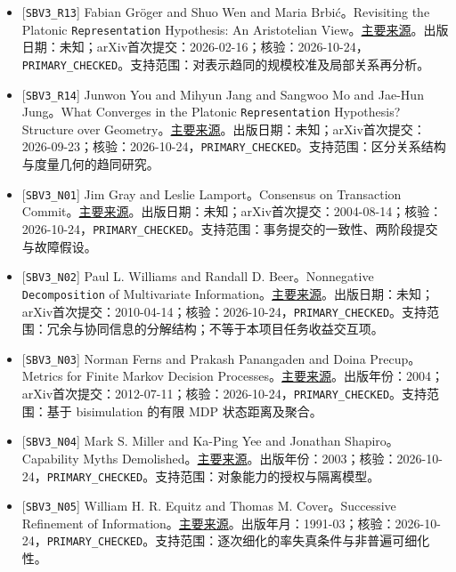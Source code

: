 \documentclass[
  10pt,
]{article}
\begin{document}
\begin{itemize}
\item
  {[}\nolinkurl{SBV3_R13}{]} Fabian Gröger and Shuo Wen and Maria
  Brbi{ć}。Revisiting the Platonic
  \nolinkurl{Representation} Hypothesis: An Aristotelian
  View。\href{https://arxiv.org/abs/2602.14486}{主要来源}。出版日期：未知；arXiv首次提交：2026-02-16；核验：2026-10-24，\nolinkurl{PRIMARY_CHECKED}。支持范围：对表示趋同的规模校准及局部关系再分析。
\item
  {[}\nolinkurl{SBV3_R14}{]} Junwon You and Mihyun Jang and Sangwoo Mo
  and Jae-Hun Jung。What Converges in the Platonic
  \nolinkurl{Representation} Hypothesis? Structure over
  Geometry。\href{https://arxiv.org/abs/2609.27252}{主要来源}。出版日期：未知；arXiv首次提交：2026-09-23；核验：2026-10-24，\nolinkurl{PRIMARY_CHECKED}。支持范围：区分关系结构与度量几何的趋同研究。
\item
  {[}\nolinkurl{SBV3_N01}{]} Jim Gray and Leslie Lamport。Consensus on
  Transaction
  Commit。\href{https://arxiv.org/abs/cs/0408036}{主要来源}。出版日期：未知；arXiv首次提交：2004-08-14；核验：2026-10-24，\nolinkurl{PRIMARY_CHECKED}。支持范围：事务提交的一致性、两阶段提交与故障假设。
\item
  {[}\nolinkurl{SBV3_N02}{]} Paul L. Williams and Randall D.
  Beer。Nonnegative \nolinkurl{Decomposition} of Multivariate
  Information。\href{https://arxiv.org/abs/1004.2515}{主要来源}。出版日期：未知；arXiv首次提交：2010-04-14；核验：2026-10-24，\nolinkurl{PRIMARY_CHECKED}。支持范围：冗余与协同信息的分解结构；不等于本项目任务收益交互项。
\item
  {[}\nolinkurl{SBV3_N03}{]} Norman Ferns and Prakash Panangaden and
  Doina Precup。Metrics for Finite Markov Decision
  Processes。\href{https://arxiv.org/abs/1207.4114}{主要来源}。出版年份：2004；arXiv首次提交：2012-07-11；核验：2026-10-24，\nolinkurl{PRIMARY_CHECKED}。支持范围：基于
  bisimulation 的有限 MDP 状态距离及聚合。
\item
  {[}\nolinkurl{SBV3_N04}{]} Mark S. Miller and Ka-Ping Yee and Jonathan
  Shapiro。Capability Myths
  Demolished。\href{https://papers.agoric.com/assets/pdf/papers/capability-myths-demolished.pdf}{主要来源}。出版年份：2003；核验：2026-10-24，\nolinkurl{PRIMARY_CHECKED}。支持范围：对象能力的授权与隔离模型。
\item
  {[}\nolinkurl{SBV3_N05}{]} William H. R. Equitz and Thomas M.
  Cover。Successive Refinement of
  Information。\href{https://isl.stanford.edu/~cover/papers/paper94.pdf}{主要来源}。出版年月：1991-03；核验：2026-10-24，\nolinkurl{PRIMARY_CHECKED}。支持范围：逐次细化的率失真条件与非普遍可细化性。

\end{itemize}
\end{document}
